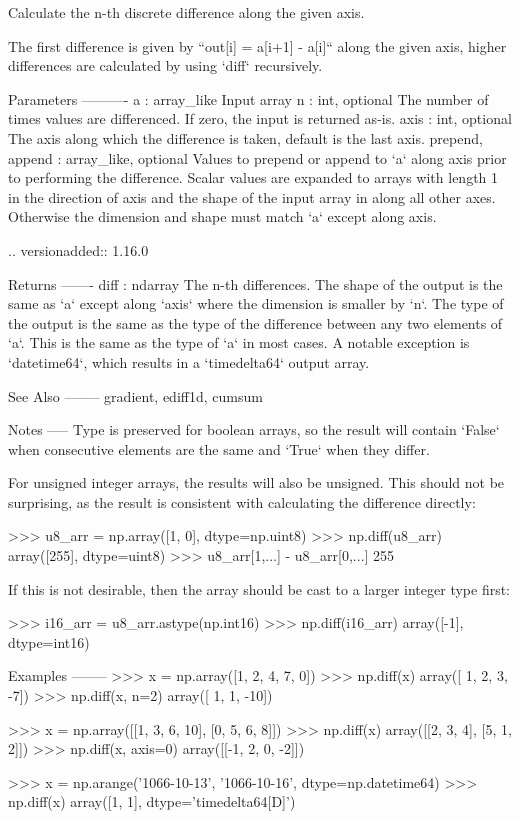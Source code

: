 \begin{DoxyVerb}Calculate the n-th discrete difference along the given axis.

The first difference is given by ``out[i] = a[i+1] - a[i]`` along
the given axis, higher differences are calculated by using `diff`
recursively.

Parameters
----------
a : array_like
    Input array
n : int, optional
    The number of times values are differenced. If zero, the input
    is returned as-is.
axis : int, optional
    The axis along which the difference is taken, default is the
    last axis.
prepend, append : array_like, optional
    Values to prepend or append to `a` along axis prior to
    performing the difference.  Scalar values are expanded to
    arrays with length 1 in the direction of axis and the shape
    of the input array in along all other axes.  Otherwise the
    dimension and shape must match `a` except along axis.

    .. versionadded:: 1.16.0

Returns
-------
diff : ndarray
    The n-th differences. The shape of the output is the same as `a`
    except along `axis` where the dimension is smaller by `n`. The
    type of the output is the same as the type of the difference
    between any two elements of `a`. This is the same as the type of
    `a` in most cases. A notable exception is `datetime64`, which
    results in a `timedelta64` output array.

See Also
--------
gradient, ediff1d, cumsum

Notes
-----
Type is preserved for boolean arrays, so the result will contain
`False` when consecutive elements are the same and `True` when they
differ.

For unsigned integer arrays, the results will also be unsigned. This
should not be surprising, as the result is consistent with
calculating the difference directly:

>>> u8_arr = np.array([1, 0], dtype=np.uint8)
>>> np.diff(u8_arr)
array([255], dtype=uint8)
>>> u8_arr[1,...] - u8_arr[0,...]
255

If this is not desirable, then the array should be cast to a larger
integer type first:

>>> i16_arr = u8_arr.astype(np.int16)
>>> np.diff(i16_arr)
array([-1], dtype=int16)

Examples
--------
>>> x = np.array([1, 2, 4, 7, 0])
>>> np.diff(x)
array([ 1,  2,  3, -7])
>>> np.diff(x, n=2)
array([  1,   1, -10])

>>> x = np.array([[1, 3, 6, 10], [0, 5, 6, 8]])
>>> np.diff(x)
array([[2, 3, 4],
       [5, 1, 2]])
>>> np.diff(x, axis=0)
array([[-1,  2,  0, -2]])

>>> x = np.arange('1066-10-13', '1066-10-16', dtype=np.datetime64)
>>> np.diff(x)
array([1, 1], dtype='timedelta64[D]')\end{DoxyVerb}
 \mbox{\label{namespacenumpy_1_1lib_1_1function__base_a42ace3c0bb0f69814003a81368507982}} 
